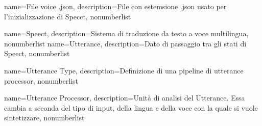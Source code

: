 {
name={File voice .json},
description={File con estemsione .json usato per l'inizializzazione di Specct},
nonumberlist
}

{
	name={Speect},
	description={Sistema di traduzione da testo a voce multilingua},
	nonumberlist
}
{
	name={Utterance},
	description={Dato di passaggio tra gli stati di Speect},
	nonumberlist
}

{
name={Utterance Type},
description={Definizione di una pipeline di utterance processor},
nonumberlist
}

{
	name={Utterance Processor},
	description={Unità di analisi del Utterance. Essa cambia a seconda del tipo di input, della lingua e della voce con la quale si vuole sintetizzare},
	nonumberlist
}

